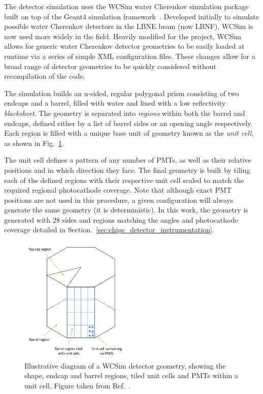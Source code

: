 The detector simulation uses the WCSim water Cherenkov simulation package~\cite{wcsim2020} built
on top of the Geant4 simulation framework~\cite{agostinelli2003, allison2006, Allison2016}.
Developed initially to simulate possible water Cherenkov detectors in the LBNE beam (now LBNF),
WCSim is now used more widely in the field. Heavily modified for the \chips project, WCSim allows
for generic water Cherenkov detector geometries to be easily loaded at runtime via a series of
simple XML configuration files. These changes allow for a broad range of detector geometries to be
quickly considered without recompilation of the code.

The simulation builds an n-sided, regular polygonal prism consisting of two endcaps and a barrel,
filled with water and lined with a low reflectivity \emph{blacksheet}. The geometry is separated
into \emph{regions} within both the barrel and endcaps, defined either by a list of barrel sides
or an opening angle respectively. Each region is filled with a unique base unit of geometry known
as the \emph{unit cell}, as shown in Fig.~\ref{fig:sim_geom}.

The unit cell defines a pattern of any number of PMTs, as well as their relative positions and in
which direction they face. The final geometry is built by tiling each of the defined regions with
their respective unit cell scaled to match the required regional photocathode coverage. Note that
although exact PMT positions are not used in this procedure, a given configuration will always
generate the same geometry (it is deterministic). In this work, the \chipsfive geometry is
generated with 28 sides and regions matching the angles and photocathode coverage detailed in
Section.~\ref{sec:chips_detector_instrumentation}.

\begin{figure} %
    \includegraphics[width=0.5\textwidth]{diagrams/4-chips/sim_geom.png}
    \caption[Illustrative diagram of a WCSim detector geometry]
    {Illustrative diagram of a WCSim detector geometry, showing the shape, endcap and barrel
        regions, tiled unit cells and PMTs within a unit cell. Figure taken from
        Ref.~\cite{blake2016}.}
    \label{fig:sim_geom}
\end{figure}

